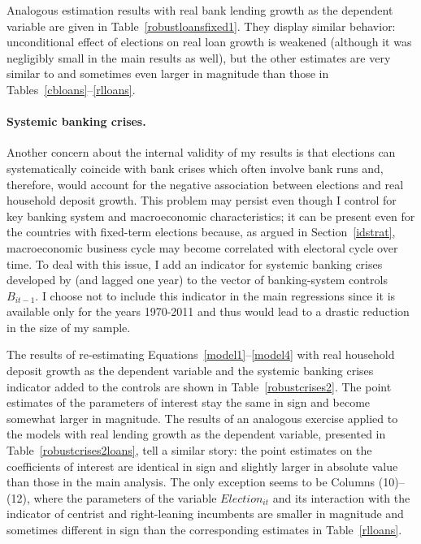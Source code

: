 \documentclass[12pt,a4paper]{article}
\begin{document}
Analogous estimation results with real bank lending growth as the dependent variable are given in Table~\ref{robustloansfixed1}. They display similar behavior: unconditional effect of elections on real loan growth is weakened (although it was negligibly small in the main results as well), but the other estimates are very similar to and sometimes even larger in magnitude than those in Tables~\ref{cbloans}--\ref{rlloans}.

\paragraph{Systemic banking crises.} Another concern about the internal validity of my results is that elections can systematically coincide with bank crises which often involve bank runs and, therefore, would account for the negative association between elections and real household deposit growth. This problem may persist even though I control for key banking system and macroeconomic characteristics; it can be present even for the countries with fixed-term elections because, as argued in Section~\ref{idstrat}, macroeconomic business cycle may become correlated with electoral cycle over time. To deal with this issue, I add an indicator for systemic banking crises developed by \citet{laeven2012systemic} (and lagged one year) to the vector of banking-system controls $B_{it-1}$. I choose not to include this indicator in the main regressions since it is available only for the years 1970-2011 and thus would lead to a drastic reduction in the size of my sample.

The results of re-estimating Equations~\eqref{model1}--\eqref{model4} with real household deposit growth as the dependent variable and the systemic banking crises indicator added to the controls are shown in Table~\ref{robustcrises2}. The point estimates of the parameters of interest stay the same in sign and become somewhat larger in magnitude. The results of an analogous exercise applied to the models with real lending growth as the dependent variable, presented in Table~\ref{robustcrises2loans}, tell a similar story: the point estimates on the coefficients of interest are identical in sign and slightly larger in absolute value than those in the main analysis. The only exception seems to be Columns (10)--(12), where the parameters of the variable $Election_{it}$ and its interaction with the indicator of centrist and right-leaning incumbents are smaller in magnitude and sometimes different in sign than the corresponding estimates in Table~\ref{rlloans}.
\end{document}
